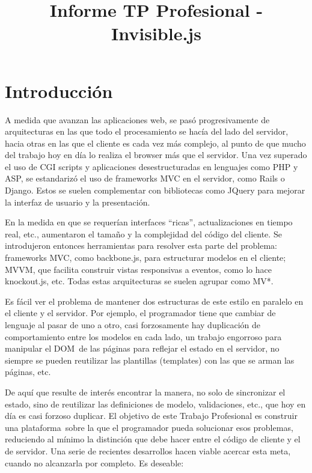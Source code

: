 \documentclass[doc,helv,longtable]{article}
\begin{document}
\title{Informe TP Profesional - Invisible.js}
\maketitle

\tableofcontents

\section{Introducción}

A medida que avanzan las aplicaciones web, se pasó progresivamente de arquitecturas en las que todo el procesamiento se hacía del lado del servidor, hacia otras en las que el cliente es cada vez más complejo, al punto de que mucho del trabajo hoy en día lo realiza el browser más que el servidor\cite{jsmvcvs}. Una vez superado el uso de CGI scripts y aplicaciones desestructuradas en lenguajes como PHP y ASP, se estandarizó el uso de frameworks MVC en el servidor, como Rails o Django. Estos se suelen complementar con bibliotecas como JQuery para mejorar la interfaz de usuario y la presentación. 

En la medida en que se requerían interfaces “ricas”\cite{rich}, actualizaciones en tiempo real, etc., aumentaron el tamaño y la complejidad del código del cliente. Se introdujeron entonces herramientas para resolver esta parte del problema\cite{richjs}: frameworks MVC, como backbone.js\cite{backbone}, para estructurar modelos en el cliente; MVVM, que facilita construir vistas responsivas a eventos, como lo hace knockout.js\cite{knockout}, etc. Todas estas arquitecturas se suelen agrupar como MV*\cite{mvw}.

Es fácil ver el problema de mantener dos estructuras de este estilo en paralelo en el cliente y el servidor. Por ejemplo, el programador tiene que cambiar de lenguaje al pasar de uno a otro, casi forzosamente hay duplicación de comportamiento entre los modelos en cada lado, un trabajo engorroso para manipular el DOM de las páginas para reflejar el estado en el servidor, no siempre se pueden reutilizar las plantillas (templates) con las que se arman las páginas, etc.\cite{wdsucks}

De aquí que resulte de interés encontrar la manera, no solo de sincronizar el estado, sino de reutilizar las definiciones de modelo, validaciones, etc., que hoy en día es casi forzoso duplicar. El objetivo de este Trabajo Profesional es construir una plataforma sobre la que el programador pueda solucionar esos problemas, reduciendo al mínimo la distinción que debe hacer entre el código de cliente y el de servidor. Una serie de recientes desarrollos hacen viable acercar esta meta, cuando no alcanzarla por completo. Es deseable:
\end{document}
